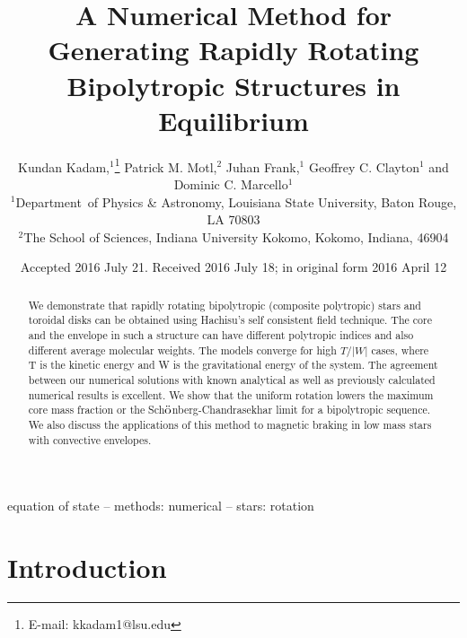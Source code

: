 \documentclass[a4paper,fleqn,usenatbib]{mnras}
\title[Rapidly Rotating Bipolytropic Structures]{A Numerical Method for Generating Rapidly Rotating Bipolytropic Structures in Equilibrium}
\author[ Kadam et al.]{
Kundan Kadam,$^{1}$\thanks{E-mail: kkadam1@lsu.edu}
Patrick M. Motl,$^{2}$
Juhan Frank,$^{1}$
Geoffrey C. Clayton$^{1}$ and  
\newauthor
Dominic C. Marcello$^{1}$
\\
$^{1}$Department\ of Physics \& Astronomy, Louisiana State University, Baton Rouge, LA 70803\\
$^{2}$The School of Sciences, Indiana University Kokomo, Kokomo, Indiana, 46904
}
\date{Accepted 2016 July 21. Received 2016 July 18; in original form 2016 April 12}
\begin{document}
\label{firstpage}
\pagerange{\pageref{firstpage}--\pageref{lastpage}}
\maketitle

\begin{abstract}
We demonstrate that rapidly rotating bipolytropic (composite polytropic) stars and toroidal disks can be obtained using Hachisu's self consistent field technique. The core and the envelope in such a structure can have different polytropic indices and also different average molecular weights. The models converge for high $T/|W|$ cases, where T is the kinetic energy and W is the gravitational energy of the system. 
The agreement between our numerical solutions with known analytical as well as previously calculated numerical results is excellent. 
We show that the uniform rotation lowers the maximum core mass fraction or the Sch$\ddot{\rm{o}}$nberg-Chandrasekhar limit for a bipolytropic sequence. We also discuss the applications of this method to magnetic braking in low mass stars with convective envelopes.
\end{abstract}

\begin{keywords}
equation of state -- methods: numerical -- stars: rotation 
\end{keywords}



\section{Introduction}


\end{document}
